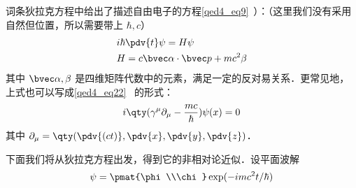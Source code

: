 

词条狄拉克方程中给出了描述自由电子的方程\autoref{qed4_eq9}~）：（这里我们没有采用自然但位置，所以需要带上 $\hbar,c$）
\begin{equation}
\begin{aligned}
&i\hbar \pdv{t} \psi = H\psi\\
&H=c\bvec \alpha\cdot \bvec p+mc^2\beta
\end{aligned}
\end{equation}
其中 $\bvec \alpha,\beta$ 是四维矩阵代数中的元素，满足一定的反对易关系．更常见地，上式也可以写成\autoref{qed4_eq22}~ 的形式：
\begin{equation}
i\qty(\gamma^\mu \partial_\mu-\frac{mc}{\hbar})\psi(x)=0
\end{equation}
其中 $\partial_\mu=\qty(\pdv{(ct)},\pdv{x},\pdv{y},\pdv{z})$．

下面我们将从狄拉克方程出发，得到它的非相对论近似．设平面波解
\begin{equation}
\psi=\pmat{\phi\\\chi}\exp(-imc^2t/\hbar)
\end{equation}
